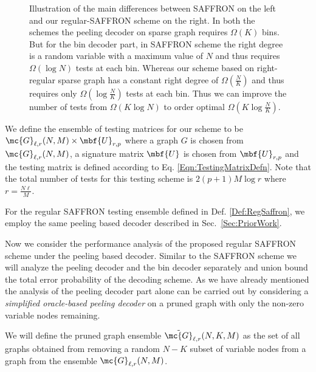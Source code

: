\documentclass[conference,twocolumn]{IEEEtran}
\newcommand*{\FigPath}{./Figures}
\begin{document}
\begin{figure*}[t!]
\centering \scalebox{1}{}
\caption{Illustration of the main differences between SAFFRON \cite{lee2015saffron} on the left and our regular-SAFFRON scheme on the right. In both the schemes the peeling decoder on sparse graph requires $\Omega(K)$ bins. But for the bin decoder part, in SAFFRON scheme the right degree is a random variable with a maximum value of $N$ and thus requires $\Omega(\log N)$ tests at each bin. Whereas our scheme based on right-regular sparse graph has a constant right degree of $\Omega(\frac{N}{K})$ and thus requires only $\Omega(\log \frac{N}{K})$ tests at each bin. Thus we can improve the number of tests from $\Omega (K\log N)$ to order optimal $\Omega(K\log \frac{N}{K})$.}
\end{figure*}

\begin{definition}
\label{Def:RegSaffron}
We define the ensemble of testing matrices for our scheme to be $\mc{G}_{\ell,r}(N,M)\times \mbf{U}_{r,p}$ where a graph $G$ is chosen from $\mc{G}_{\ell,r}(N,M)$, a signature matrix $\mbf{U}$ is chosen from $\mbf{U}_{r,p}$ and the testing matrix is defined according to Eq. \eqref{Eqn:TestingMatrixDefn}. Note that the total number of tests for this testing scheme is $2(p+1)M\log r$ where $r=\frac{N\ell}{M}$.
\end{definition}

For the regular SAFFRON testing ensemble defined in Def. \ref{Def:RegSaffron}, we employ the same peeling based decoder described in Sec.~\ref{Sec:PriorWork}. 

Now we consider the performance analysis of the proposed regular SAFFRON scheme under the peeling based decoder. Similar to the SAFFRON scheme we will analyze the peeling decoder and the bin decoder separately and union bound the total error probability of the decoding scheme. As we have already mentioned the analysis of the peeling decoder part alone can be carried out by considering a \textit{simplified oracle-based peeling decoder} on a pruned graph with only the non-zero variable nodes remaining. 

\begin{definition}
We will define the pruned graph ensemble $\tilde{\mc{G}}_{\ell,r}(N,K,M)$ as the set of all graphs obtained from removing a random $N-K$ subset of variable nodes from a graph from the ensemble $\mc{G}_{\ell,r}(N,M)$.
\end{definition}
\end{document}
